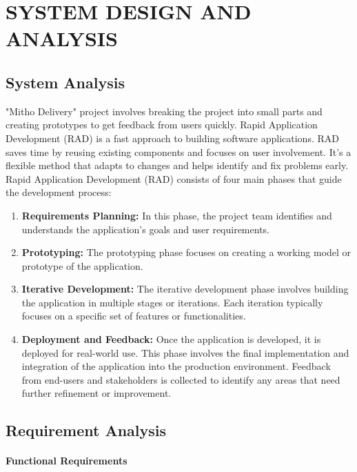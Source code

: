 \chapter{SYSTEM DESIGN AND ANALYSIS}
\section{System Analysis}
"Mitho Delivery" project involves breaking the project into small parts and creating prototypes to get feedback from users quickly. Rapid Application Development (RAD) is a fast approach to building software applications. RAD saves time by reusing existing components and focuses on user involvement. It's a flexible method that adapts to changes and helps identify and fix problems early.\\
Rapid Application Development (RAD) consists of four main phases that guide the development process:

\begin{enumerate}

\item \textbf{Requirements Planning:} In this phase, the project team identifies and understands the application's goals and user requirements.
\item \textbf{Prototyping:} The prototyping phase focuses on creating a working model or prototype of the application. 
\item \textbf{Iterative Development:} The iterative development phase involves building the application in multiple stages or iterations. Each iteration typically focuses on a specific set of features or functionalities. 
\item \textbf{Deployment and Feedback:} Once the application is developed, it is deployed for real-world use. This phase involves the final implementation and integration of the application into the production environment. Feedback from end-users and stakeholders is collected to identify any areas that need further refinement or improvement.
\end{enumerate}

\section{Requirement Analysis}
\subsubsection{Functional Requirements}

